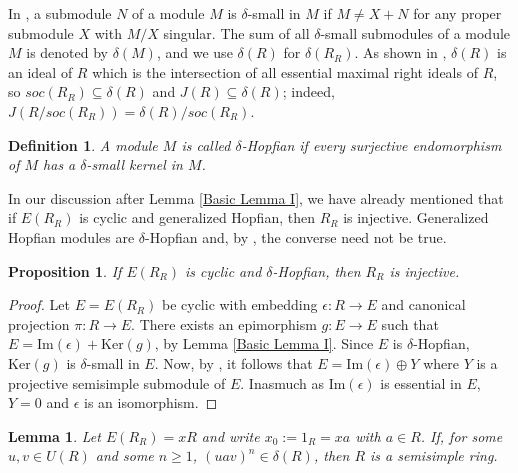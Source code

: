 \documentclass{amsart}
\theoremstyle{plain}
\newtheorem{definition}[theorem]{Definition}
\newtheorem{lemma}[theorem]{Lemma}
\newtheorem{proposition}[theorem]{Proposition}
\numberwithin{equation}{section}
\begin{document}
\medskip In \cite{Z}, a submodule $N$ of a module $M$ is $\delta $-small in $M$ if $M \neq X +N$ for any proper submodule $X$ with $M/X$ singular. The sum of all $\delta $-small submodules of a module $M$ is denoted by $\delta  (M)$, and we use $\delta  (R)$ for $\delta  (R_{R})$. As shown in \cite{Z}, $\delta  (R)$ is an ideal of $R$ which is the intersection of all essential maximal right ideals of $R$, so $s o c (R_{R}) \subseteq \delta  (R)$ and $J (R) \subseteq \delta  (R)$; indeed, $J (R/s o c (R_{R})) =\delta  (R)/s o c (R_{R})$. 


\begin{definition}
\cite{EKP} A module $M$ is called  {$\delta $-Hopfian} if every surjective endomorphism of $M$ has a $\delta $-small kernel in $M$. 
\end{definition}

In our discussion after Lemma \ref{Basic Lemma I}, we
have already mentioned that if $E (R_{R})$ is cyclic and generalized Hopfian, then $R_{R}$ is injective. Generalized Hopfian modules are $\delta $-Hopfian and, by \cite[Example 1]{EKP},
the converse need not be true. 


\begin{proposition}
\label{If E(R) is cyclic and delta-Hopfian, then R is injective}
If $E (R_{R})$ is cyclic and $\delta $-Hopfian, then $R_{R}$ is injective. 
\end{proposition}


\begin{proof}
Let $E =E (R_{R})$ be cyclic with embedding $\epsilon  :R \rightarrow E$ and canonical projection $\pi  :R \rightarrow E$. There exists an epimorphism $g :E \rightarrow E$ such that $E =\mathrm{I} \mathrm{m} (\epsilon ) +\mathrm{K} \mathrm{e} \mathrm{r} (g)$, by Lemma \ref{Basic Lemma I}. Since $E$ is $\delta $-Hopfian, $\mathrm{K} \mathrm{e} \mathrm{r} (g)$ is $\delta $-small in $E$. Now, by \cite[Lemma 1.2]{Z},
it follows that $E =\mathrm{I} \mathrm{m} (\epsilon ) \oplus Y$ where $Y$ is a projective semisimple submodule of $E$. Inasmuch as $\mathrm{I} \mathrm{m} (\epsilon )$ is essential in $E$, $Y =0$ and $\epsilon $ is an isomorphism. 
\end{proof}


\begin{lemma}
\label{Basic Lemma II}Let $E (R_{R}) =x R$ and write $x_{0}:=1_{R} =x a$ with $a \in R$. If, for some $u ,v \in U (R)$ and some $n \geq 1$, $(u a v)^{n} \in \delta  (R)$, then $R$ is a semisimple ring. 
\end{lemma}
\end{document}
